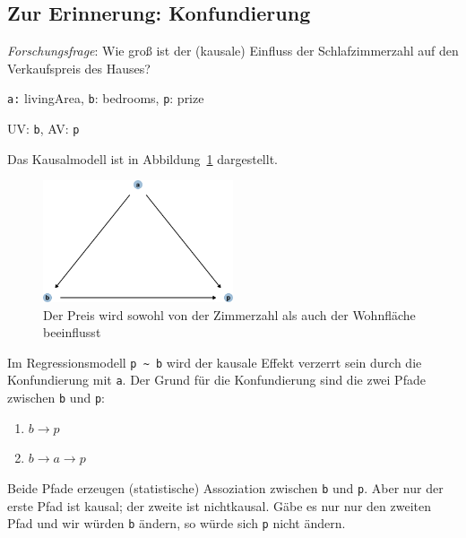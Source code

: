 \documentclass[
  a4paper,
  DIV=11]{scrreprt}
\providecommand{\tightlist}{%
  \setlength{\itemsep}{0pt}\setlength{\parskip}{0pt}}\usepackage{longtable,booktabs,array}
\theoremstyle{definition}
\theoremstyle{remark}
\begin{document}
\hypertarget{zur-erinnerung-konfundierung}{%
\subsection{Zur Erinnerung:
Konfundierung}\label{zur-erinnerung-konfundierung}}

\emph{Forschungsfrage}: Wie groß ist der (kausale) Einfluss der
Schlafzimmerzahl auf den Verkaufspreis des Hauses?

\texttt{a:} livingArea, \texttt{b}: bedrooms, \texttt{p}: prize

UV: \texttt{b}, AV: \texttt{p}

Das Kausalmodell ist in Abbildung~\ref{fig-dag-don1} dargestellt.

\begin{figure}

{\centering \includegraphics[width=0.5\textwidth,height=\textheight]{./kausal_files/figure-pdf/fig-dag-don1-1.pdf}

}

\caption{\label{fig-dag-don1}Der Preis wird sowohl von der Zimmerzahl
als auch der Wohnfläche beeinflusst}

\end{figure}

Im Regressionsmodell \texttt{p\ \textasciitilde{}\ b} wird der kausale
Effekt verzerrt sein durch die Konfundierung mit \texttt{a}. Der Grund
für die Konfundierung sind die zwei Pfade zwischen \texttt{b} und
\texttt{p}:

\begin{enumerate}
\def\labelenumi{\arabic{enumi}.}
\tightlist
\item
  \(b \rightarrow p\)
\item
  \(b \rightarrow a \rightarrow p\)
\end{enumerate}

Beide Pfade erzeugen (statistische) Assoziation zwischen \texttt{b} und
\texttt{p}. Aber nur der erste Pfad ist kausal; der zweite ist
nichtkausal. Gäbe es nur nur den zweiten Pfad und wir würden \texttt{b}
ändern, so würde sich \texttt{p} nicht ändern.
\end{document}
